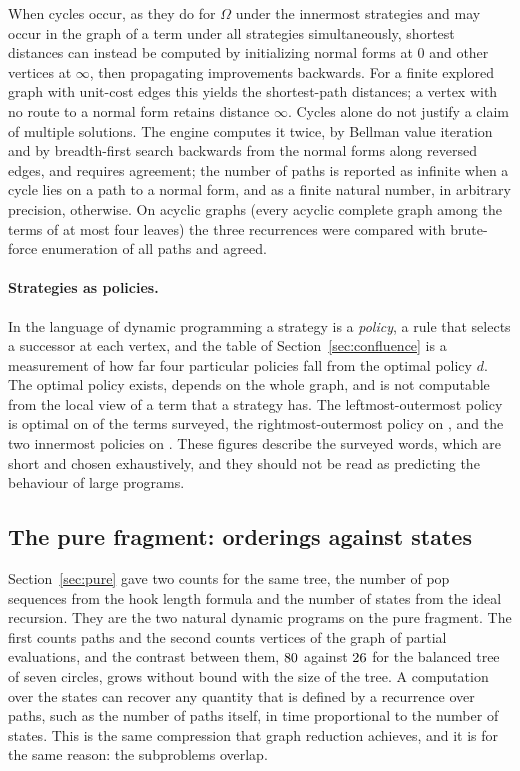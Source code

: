 When cycles occur, as they do for $\Omega$ under the innermost strategies and may occur in the graph of a term under all strategies simultaneously, shortest distances can instead be computed by initializing normal forms at $0$ and other vertices at $\infty$, then propagating improvements backwards. For a finite explored graph with unit-cost edges this yields the shortest-path distances; a vertex with no route to a normal form retains distance $\infty$. Cycles alone do not justify a claim of multiple solutions. The engine computes it twice, by Bellman value iteration and by breadth-first search backwards from the normal forms along reversed edges, and requires agreement; the number of paths is reported as infinite when a cycle lies on a path to a normal form, and as a finite natural number, in arbitrary precision, otherwise. On \factBellmanGraphs{} acyclic graphs (every acyclic complete graph among the terms of at most four leaves) the three recurrences were compared with brute-force enumeration of all paths and agreed.

\paragraph{Strategies as policies.} In the language of dynamic programming a strategy is a \emph{policy}, a rule that selects a successor at each vertex, and the table of Section~\ref{sec:confluence} is a measurement of how far four particular policies fall from the optimal policy $d$. The optimal policy exists, depends on the whole graph, and is not computable from the local view of a term that a strategy has. The leftmost-outermost policy is optimal on \factLoOptPct{} of the terms surveyed, the rightmost-outermost policy on \factRoOptPct{}, and the two innermost policies on \factLiOptPct{}. These figures describe the surveyed words, which are short and chosen exhaustively, and they should not be read as predicting the behaviour of large programs.

\subsection{The pure fragment: orderings against states}

Section~\ref{sec:pure} gave two counts for the same tree, the number of pop sequences from the hook length formula and the number of states from the ideal recursion. They are the two natural dynamic programs on the pure fragment. The first counts paths and the second counts vertices of the graph of partial evaluations, and the contrast between them, $80$ against $26$ for the balanced tree of seven circles, grows without bound with the size of the tree. A computation over the states can recover any quantity that is defined by a recurrence over paths, such as the number of paths itself, in time proportional to the number of states. This is the same compression that graph reduction achieves, and it is for the same reason: the subproblems overlap.

